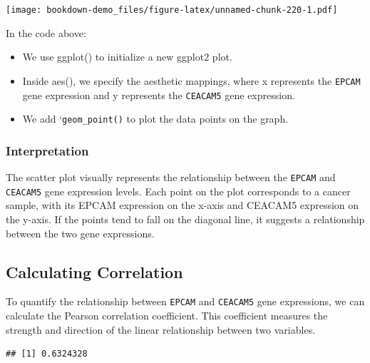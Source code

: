 \documentclass[
]{book}
\newenvironment{Shaded}{\begin{snugshade}}{\end{snugshade}}
\newcommand{\CommentTok}[1]{\textcolor[rgb]{0.56,0.35,0.01}{\textit{#1}}}
\newcommand{\FunctionTok}[1]{\textcolor[rgb]{0.13,0.29,0.53}{\textbf{#1}}}
\newcommand{\NormalTok}[1]{#1}
\newcommand{\OtherTok}[1]{\textcolor[rgb]{0.56,0.35,0.01}{#1}}
\newcommand{\SpecialCharTok}[1]{\textcolor[rgb]{0.81,0.36,0.00}{\textbf{#1}}}
\begin{document}
\texttt{[image: bookdown-demo\_files/figure-latex/unnamed-chunk-220-1.pdf]}

In the code above:

\begin{itemize}
\item
  We use ggplot() to initialize a new ggplot2 plot.
\item
  Inside aes(), we specify the aesthetic mappings, where x represents the \texttt{EPCAM} gene expression and y represents the \texttt{CEACAM5} gene expression.
\item
  We add `\texttt{geom\_point()} to plot the data points on the graph.
\end{itemize}

\hypertarget{interpretation}{%
\subsubsection{Interpretation}\label{interpretation}}

The scatter plot visually represents the relationship between the \texttt{EPCAM} and \texttt{CEACAM5} gene expression levels. Each point on the plot corresponds to a cancer sample, with its EPCAM expression on the x-axis and CEACAM5 expression on the y-axis. If the points tend to fall on the diagonal line, it suggests a relationship between the two gene expressions.

\hypertarget{calculating-correlation}{%
\subsection{Calculating Correlation}\label{calculating-correlation}}

To quantify the relationship between \texttt{EPCAM} and \texttt{CEACAM5} gene expressions, we can calculate the Pearson correlation coefficient. This coefficient measures the strength and direction of the linear relationship between two variables.

\begin{Shaded}
\end{Shaded}

\begin{verbatim}
## [1] 0.6324328
\end{verbatim}
\end{document}
